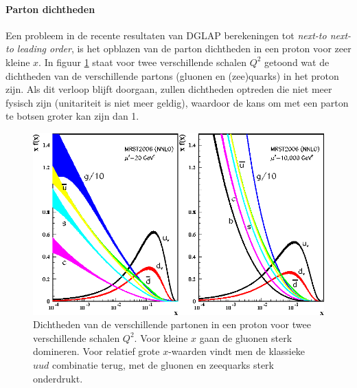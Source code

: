 \documentclass[a4paper,11pt]{article}
\numberwithin{equation}{section} %
\begin{document}
      \paragraph{Parton dichtheden}
Een probleem in de recente resultaten van DGLAP berekeningen tot \textit{next-to next-to leading order}, is het opblazen van de parton dichtheden in een proton voor zeer kleine $x$.
In figuur \ref{fig:PD} staat voor twee verschillende schalen $Q^2$ getoond wat de dichtheden van de verschillende partons (gluonen en (zee)quarks) in het proton zijn.
Als dit verloop blijft doorgaan, zullen dichtheden optreden die niet meer fysisch zijn (unitariteit is niet meer geldig), waardoor de kans om met een parton te botsen groter kan zijn dan 1.
\begin{figure} [H]
  \begin{center}
    \includegraphics[scale=1]{Afbeeldingen/PD.eps}
    \caption{Dichtheden van de verschillende partonen in een proton voor twee verschillende schalen $Q^2$. Voor kleine $x$ gaan de gluonen sterk domineren. Voor relatief grote $x$-waarden vindt men de klassieke $uud$ combinatie terug, met de gluonen en zeequarks sterk onderdrukt. \cite{Martin}}
   \label{fig:PD}
  \end{center}
\end{figure}
\end{document}
